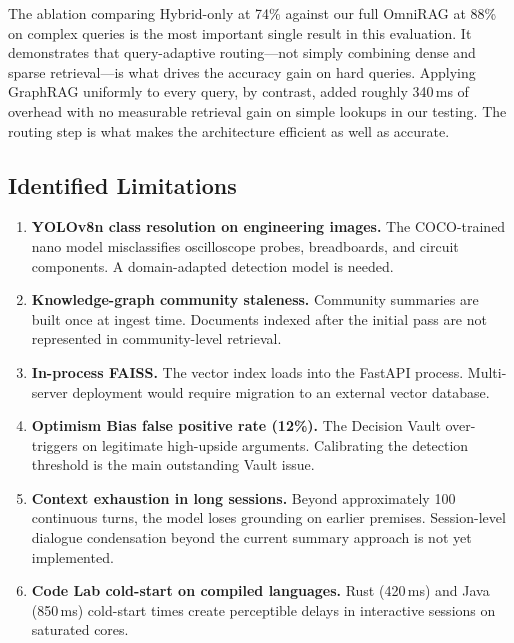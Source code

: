 The ablation comparing Hybrid-only at 74\% against our full OmniRAG at
88\% on complex queries is the most important single result in this
evaluation. It demonstrates that query-adaptive routing---not simply
combining dense and sparse retrieval---is what drives the accuracy gain
on hard queries. Applying GraphRAG uniformly to every query, by contrast,
added roughly 340\,ms of overhead with no measurable retrieval gain on
simple lookups in our testing. The routing step is what makes the
architecture efficient as well as accurate.

\subsection{Identified Limitations}

\begin{enumerate}
    \item \textbf{YOLOv8n class resolution on engineering images.}
    The COCO-trained nano model misclassifies oscilloscope probes,
    breadboards, and circuit components. A domain-adapted detection model
    is needed.

    \item \textbf{Knowledge-graph community staleness.}
    Community summaries are built once at ingest time. Documents indexed
    after the initial pass are not represented in community-level retrieval.

    \item \textbf{In-process FAISS.}
    The vector index loads into the FastAPI process. Multi-server
    deployment would require migration to an external vector database.

    \item \textbf{Optimism Bias false positive rate (12\%).}
    The Decision Vault over-triggers on legitimate high-upside arguments.
    Calibrating the detection threshold is the main outstanding Vault issue.

    \item \textbf{Context exhaustion in long sessions.}
    Beyond approximately 100 continuous turns, the model loses grounding
    on earlier premises. Session-level dialogue condensation beyond the
    current summary approach is not yet implemented.

    \item \textbf{Code Lab cold-start on compiled languages.}
    Rust (420\,ms) and Java (850\,ms) cold-start times create perceptible
    delays in interactive sessions on saturated cores.
\end{enumerate}

